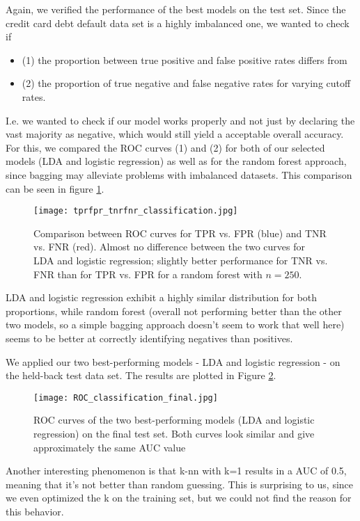 \documentclass[a4paper]{article}
\begin{document}
Again, we verified the performance of the best models on the test set. Since the credit card debt default data set is a highly imbalanced one, we wanted to check if
\begin{itemize}
	\item (1) the proportion between true positive and false positive rates differs from
    \item (2) the proportion of true negative and false negative rates for varying cutoff rates.
\end{itemize}
I.e. we wanted to check if our model works properly and not just by declaring the vast majority as negative, which would still yield a acceptable overall accuracy. For this, we compared the ROC curves (1) and (2) for both of our selected models (LDA and logistic regression) as well as for the random forest approach, since bagging may alleviate problems with imbalanced datasets. This comparison can be seen in figure \ref{fig:tprfpr_tnrfnr_comparison}.

\begin{figure}[H]
	\centering
 	\texttt{[image: tprfpr\_tnrfnr\_classification.jpg]}
 	\caption{\label{fig:tprfpr_tnrfnr_comparison} Comparison between ROC curves for TPR vs. FPR (blue) and TNR vs. FNR (red). Almost no difference between the two curves for LDA and logistic regression; slightly better performance for TNR vs. FNR than for TPR vs. FPR for a random forest with $n = 250$.}
\end{figure}

LDA and logistic regression exhibit a highly similar distribution for both proportions, while random forest (overall not performing better than the other two models, so a simple bagging approach  doesn't seem to work that well here) seems to be better at correctly identifying negatives than positives.
 
We applied our two best-performing models - LDA and logistic regression - on the held-back test data set. The results are plotted in Figure \ref{fig:roc_classification_final}.

\begin{figure}[H]
	\centering
 	\texttt{[image: ROC\_classification\_final.jpg]}
 	\caption{\label{fig:roc_classification_final} ROC curves of the two best-performing models (LDA and logistic regression) on the final test set. Both curves look similar and give approximately the same AUC value}
\end{figure}
 
Another interesting phenomenon is that k-nn with k=1 results in a AUC of 0.5, meaning that it's not better than random guessing. This is surprising to us, since we even optimized the k on the training set, but we could not find the reason for this behavior.  
\end{document}
